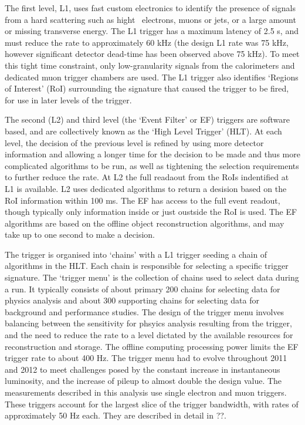 The
first level, L1, uses fast custom electronics to identify the presence of signals from a hard scattering such as
hight \pt\ electrons, muons or jets, or a large amount or missing transverse
energy. The L1 trigger has a maximum latency of 2.5 \micro s, and must reduce
the rate to approximately 60 kHz (the design L1 rate was 75 kHz, however
significant detector dead-time has been observed above 75 kHz). To meet this
tight time constraint, only low-granularity signals from the calorimeters and dedicated muon trigger
chambers are used. The L1 trigger also identifies `Regions of Interest' (RoI)
surrounding the signature that caused the trigger to be fired, for use in later
levels of the trigger.

The second (L2) and third level (the `Event
Filter' or EF) triggers are software based, and are collectively known as the
`High Level Trigger' (HLT). At each level, the decision of the previous level is
refined by using more detector information and allowing a longer time for the
decision to be made and thus more complicated algorithms to be run, as well as
tightening the selection requirements to further reduce the rate. At L2 the full
readaout from the RoIs indentified at L1 is available. L2 uses dedicated
algorithms to return a desision based on the RoI information within 100 ms. The
EF has access to the full event readout, though typically only information
inside or just oustside the RoI is used. The EF algorithms are based on the
offline object reconstruction algorithms, and may take up to one second to make
a decision.

The trigger is organised into `chains' with a L1 trigger seeding a chain of
algorithms in the HLT. Each chain is responsible for selecting a specific
trigger signature. The `trigger menu' is the collection of chains used to select
data during a run. It typically consists of about primary 200 chains for selecting data
for physics analysis and about 300 supporting chains for selecting data for
background and performance studies. The design of the trigger menu involves
balancing between the sensitivity for phsyics analysis resulting from the
trigger, and the need to reduce the rate to a level dictated by the available
resources for reconstruction and storage. The offline computing processing power
limits the EF trigger rate to about 400 Hz. The trigger menu had to evolve
throughout 2011 and 2012 to meet challenges posed by the constant increase in
instantaneous luminosity, and the increase of pileup to almost double the design
value. The measurements described in this analysis use single electron and muon
triggers. These triggers account for the largest slice of the trigger bandwidth,
with rates of approximately 50 Hz each. They are described in detail in ??.

